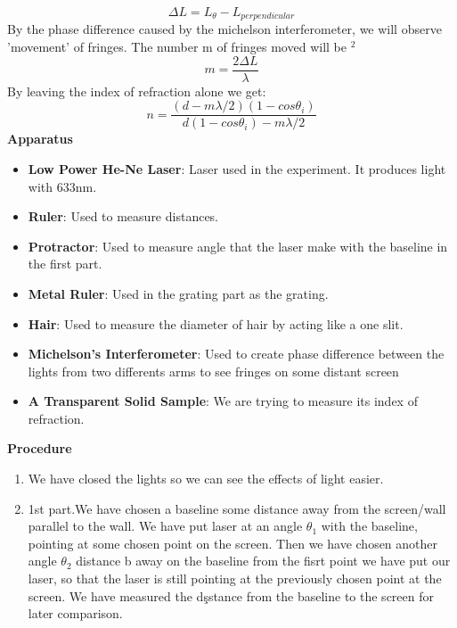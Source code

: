 \documentclass[10pt,a4paper]{article}
\begin{document}
{\begin{equation}
\Delta L= L_{\theta}- L_{perpendicular}	
\end{equation}
By the phase difference caused by the michelson interferometer, we will observe 'movement' of fringes. The number m of fringes moved will be $^2$
\begin{equation}
m=\frac {2\Delta L}{\lambda}
\end{equation}
By leaving the index of refraction alone we get:
\begin{equation}
n=\frac {(d-m\lambda/2)(1-cos\theta_i)}{d(1-cos\theta_i)-m\lambda/2}
\end{equation}
\textbf{Apparatus}\\[\baselineskip]

\begin{itemize}
	\item \textbf{Low Power He-Ne Laser}: Laser used in the experiment. It produces light with 633nm.
	\item \textbf{Ruler}: Used to measure distances.
	\item \textbf{Protractor}: Used to measure angle that the laser make with the baseline in the first part.
	\item \textbf{Metal Ruler}: Used in the grating part as the grating.
	\item \textbf{Hair}: Used to measure the diameter of hair by acting like a one slit.
	\item \textbf{Michelson's Interferometer}: Used to create phase difference between the lights from two differents arms to see fringes on some distant screen
	\item \textbf{A Transparent Solid Sample}: We are trying to measure its index of refraction.
	\\[\baselineskip]
\end{itemize}
\textbf{Procedure}\\[\baselineskip]
\begin{enumerate}
	\item We have closed the lights so we can see the effects of light easier.
	\item 1st part.We have chosen a baseline some distance away from the screen/wall parallel to the wall. We have put laser at an angle $\theta_1$ with the baseline, pointing at some chosen point on the screen. Then we have chosen another angle $\theta_2$ distance b away on the baseline from the fisrt point we have put our laser, so that the laser is still pointing at the previously chosen point at the screen. We have measured the dşstance from the baseline to the screen for later comparison.

\end{enumerate}}
\end{document}
